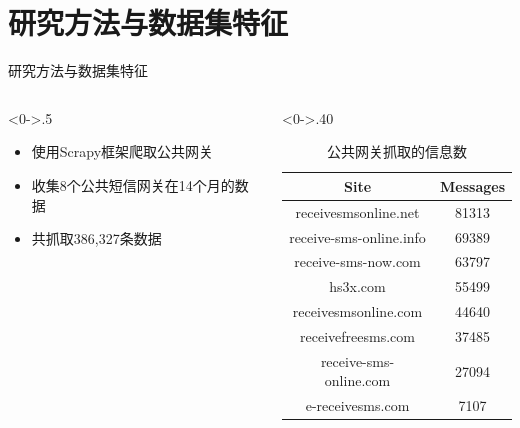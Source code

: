 \documentclass[10pt,aspectratio=43,mathserif,table]{beamer}
\begin{document}
\section{研究方法与数据集特征}
\begin{frame}{研究方法与数据集特征}
\begin{columns}[c] %
	\begin{column}<0->{.5\textwidth}
		\vspace*{1cm}
		\begin{itemize}
			\item 使用Scrapy框架爬取公共网关
		\end{itemize}
	
		\begin{itemize}
			\item 收集8个公共短信网关在14个月的数据
		\end{itemize}
	
		\begin{itemize}
			\item 共抓取386,327条数据
		\end{itemize}
    \end{column}%
\hfill%
	\begin{column}<0->{.40\textwidth}
		\begin{table}
			\caption{公共网关抓取的信息数}
			\footnotesize
			\begin{tabular}{|c|c|}
				\hline
				\textbf{Site}           & \textbf{Messages}\\
				\hline
				receivesmsonline.net    &81313\\
				\hline
				receive-sms-online.info &69389\\
				\hline
				receive-sms-now.com     &63797\\
				\hline
				hs3x.com               &55499\\
				\hline
				receivesmsonline.com    &44640\\
				\hline
				receivefreesms.com      &37485\\
				\hline
				receive-sms-online.com  &27094\\
				\hline
				e-receivesms.com       &7107\\
				\hline
			\end{tabular}
		\end{table}
    \end{column}%
\end{columns}
\end{frame}
\end{document}
